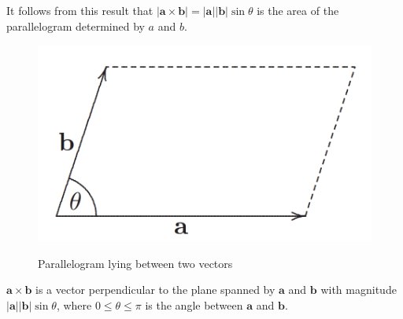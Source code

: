 \documentclass[12pt]{article}
\begin{document}
It follows from this result that $|\pmb{a} \times \pmb{b}| = |\pmb{a}||\pmb{b}|\sin \theta$ 
is the area of the parallelogram determined by $a$ and $b$.

\begin{center}
  \begin{figure}[h]
    \centering
    \includegraphics[width=\linewidth/3]{figures/fig7.png}
    \label{fig:7}
    \caption{Parallelogram lying between two vectors}
  \end{figure}
\end{center}

$\pmb{a} \times \pmb{b}$ is a vector perpendicular to the plane spanned by $\pmb{a}$ and $\pmb{b}$ with magnitude 
$|\pmb{a}||\pmb{b}|\sin \theta$, where $0 \leq \theta \leq \pi$ is the angle between $\pmb{a}$ and $\pmb{b}$.
\end{document}
